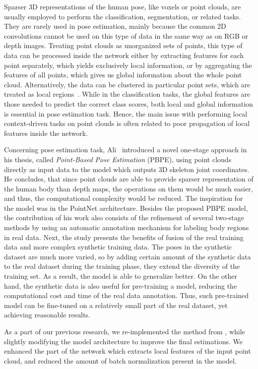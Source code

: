 \noindent
Sparser 3D representations of the human pose, like voxels or point clouds, are usually employed to perform the classification, segmentation, or related tasks. They are rarely used in pose estimation, mainly because the common 2D convolutions cannot be used on this type of data in the same way as on RGB or depth images. Treating point clouds as unorganized sets of points, this type of data can be processed inside the network either by extracting features for each point separately, which yields exclusively local information, or by aggregating the features of all points, which gives us global information about the whole point cloud. Alternatively, the data can be clustered in particular point sets, which are treated as local regions~\cite{DBLP:journals/corr/abs-1811-07246}. While in the classification tasks, the global features are those needed to predict the correct class scores, both local and global information is essential in pose estimation task. Hence, the main issue with performing local context-driven tasks on point clouds is often related to poor propagation of local features inside the network.\par
\vspace{5mm}
\noindent Concerning pose estimation task, Ali~\cite{Ali19} introduced a novel one-stage approach in his thesis, called \textit{Point-Based Pose Estimation} (PBPE), using point clouds directly as input data to the model which outputs 3D skeleton joint coordinates. He concludes, that since point clouds are able to provide sparser representation of the human body than depth maps, the operations on them would be much easier, and thus, the computational complexity would be reduced. The inspiration for the model was in the PointNet architecture. Besides the proposed PBPE model, the contribution of his work also consists of the refinement of several two-stage methods by using an automatic annotation mechanism for labeling body regions in real data. Next, the study presents the benefits of fusion of the real training data and more complex synthetic training data. The poses in the synthetic dataset are much more varied, so by adding certain amount of the synthetic data to the real dataset during the training phase, they extend the diversity of the training set. As a result, the model is able to generalize better. On the other hand, the synthetic data is also useful for pre-training a model, reducing the computational cost and time of the real data annotation. Thus, such pre-trained model can be fine-tuned on a relatively small part of the real dataset, yet achieving reasonable results. \par
\vspace{5mm}
\noindent As a part of our previous research, we re-implemented the method from \cite{Ali19}, while slightly modifying the model architecture to improve the final estimations. We enhanced the part of the network which extracts local features of the input point cloud, and reduced the amount of batch normalization present in the model.\par

